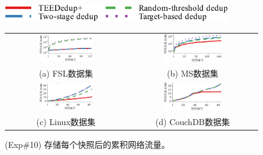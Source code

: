 \begin{figure}[!htb]
    \centering
    \includegraphics[height=21pt]{pic/featurespy/plot/bandwidth/upload_traffic_legend.pdf}
    \vspace{5pt} \\
    \begin{tabular}{@{\ }c@{\ }c}
        \includegraphics[width=0.47\textwidth]{pic/featurespy/plot/bandwidth/upload_traffic_fsl.pdf}   &
        \includegraphics[width=0.47\textwidth]{pic/featurespy/plot/bandwidth/upload_traffic_ms.pdf}                                 \\
        {\small (a) FSL数据集}                                                                         & {\small (b) MS数据集}      \\
        \includegraphics[width=0.47\textwidth]{pic/featurespy/plot/bandwidth/upload_traffic_linux.pdf} &
        \includegraphics[width=0.47\textwidth]{pic/featurespy/plot/bandwidth/upload_traffic_couch.pdf}                              \\
        {\small (c) Linux数据集}                                                                       & {\small (d) CouchDB数据集}
    \end{tabular}
    \caption{(Exp\#10) 存储每个快照后的累积网络流量。}
    \label{fig:featurespy-expNetworkTraffic}
\end{figure}

